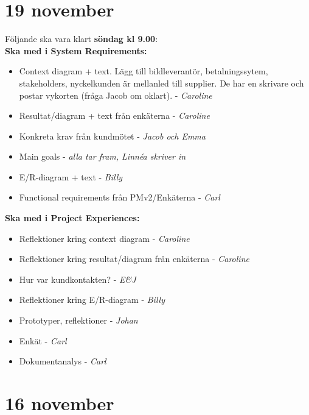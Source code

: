 \documentclass[10pt,a4paper]{article}
\author{Linnéa Claesson}
\begin{document}
\section*{19 november}
{\Large Följande ska vara klart \textbf{söndag kl 9.00}:}\\

\textbf{Ska med i System Requirements:}
\begin{itemize}
\item Context diagram + text. Lägg till bildleverantör, betalningssytem, stakeholders, nyckelkunden är mellanled till supplier. De har en skrivare och postar vykorten (fråga Jacob om oklart). - \textit{Caroline}
\item Resultat/diagram + text från enkäterna - \textit{Caroline}
\item Konkreta krav från kundmötet - \textit{Jacob och Emma}
\item Main goals - \textit{alla tar fram, Linn\'ea skriver in}
\item E/R-diagram + text - \textit{Billy}
\item Functional requirements från PMv2/Enkäterna - \textit{Carl}

\end{itemize}

\textbf{Ska med i Project Experiences:}
\begin{itemize}
\item Reflektioner kring context diagram - \textit{Caroline}
\item Reflektioner kring resultat/diagram från enkäterna - \textit{Caroline}
\item Hur var kundkontakten? - \textit{E\&J}
\item Reflektioner kring E/R-diagram - \textit{Billy}
\item Prototyper, reflektioner - \textit{Johan}
\item Enkät - \textit{Carl}
\item Dokumentanalys - \textit{Carl}

\end{itemize}

\section*{16 november}
\end{document}
